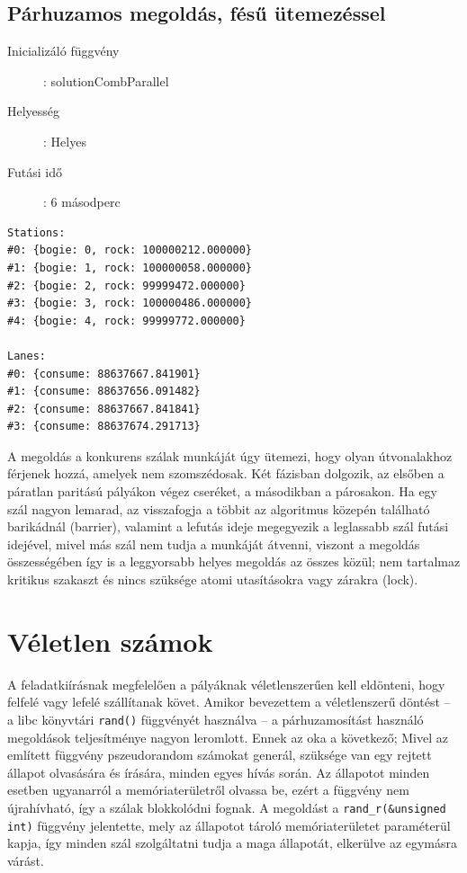 \documentclass[a4paper,10pt]{article}
\begin{document}
    \subsection{Párhuzamos megoldás, fésű ütemezéssel}
\begin{description}
  \item[Inicializáló függvény]: solutionCombParallel
  \item[Helyesség]: Helyes
  \item[Futási idő]: 6 másodperc
\end{description}

\begin{lstlisting}
Stations:
#0: {bogie: 0, rock: 100000212.000000}
#1: {bogie: 1, rock: 100000058.000000}
#2: {bogie: 2, rock: 99999472.000000}
#3: {bogie: 3, rock: 100000486.000000}
#4: {bogie: 4, rock: 99999772.000000}

Lanes:
#0: {consume: 88637667.841901}
#1: {consume: 88637656.091482}
#2: {consume: 88637667.841841}
#3: {consume: 88637674.291713}
\end{lstlisting}

A megoldás a konkurens szálak munkáját úgy ütemezi, hogy olyan útvonalakhoz férjenek hozzá, amelyek nem szomszédosak. Két fázisban dolgozik, az elsőben a páratlan paritású pályákon végez cseréket, a másodikban a párosakon. Ha egy szál nagyon lemarad, az visszafogja a többit az algoritmus közepén található barikádnál (barrier), valamint a lefutás ideje megegyezik a leglassabb szál futási idejével, mivel más szál nem tudja a munkáját átvenni, viszont a megoldás összességében így is a leggyorsabb helyes megoldás az összes közül; nem tartalmaz kritikus szakaszt és nincs szüksége atomi utasításokra vagy zárakra (lock).
    
	\section{Véletlen számok}
A feladatkiírásnak megfelelően a pályáknak véletlenszerűen kell eldönteni, hogy	felfelé vagy lefelé szállítanak követ. Amikor bevezettem a véletlenszerű döntést -- a libc könyvtári \texttt{rand()} függvényét használva -- a párhuzamosítást használó megoldások teljesítménye nagyon leromlott. Ennek az oka a következő; Mivel az említett függvény pszeudorandom számokat generál, szüksége van egy rejtett állapot olvasására és írására, minden egyes hívás során. Az állapotot minden esetben ugyanarról a memóriaterületről olvassa be, ezért a függvény nem újrahívható, így a szálak blokkolódni fognak.
A megoldást a \texttt{rand\_r(\&unsigned int)} függvény jelentette, mely az állapotot tároló memóriaterületet paraméterül kapja, így minden szál szolgáltatni tudja a maga állapotát, elkerülve az egymásra várást.
	
\end{document}
